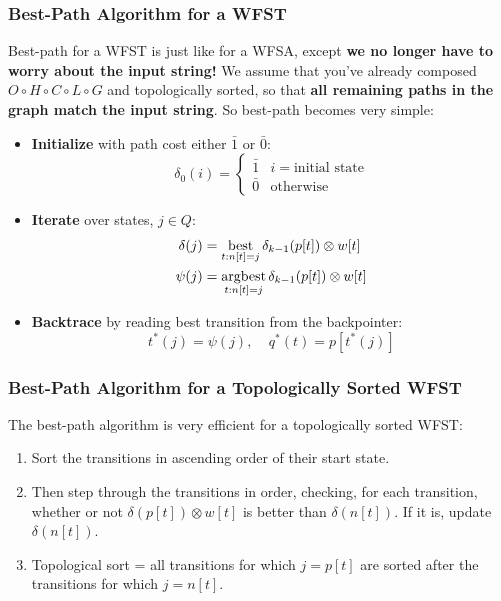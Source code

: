 \documentclass{beamer}
\newcommand{\best}{\operatornamewithlimits{best}}
\newcommand{\argbest}{\operatornamewithlimits{argbest}}
\begin{document}
\begin{frame}
  \frametitle{Best-Path Algorithm for a WFST}

  Best-path for a WFST is just like for a WFSA, except {\bf we no
    longer have to worry about the input string!}  We assume that
  you've already composed $O\circ H\circ C\circ L\circ G$ and
  topologically sorted, so that {\bf all remaining paths in the graph
    match the input string}.  So best-path becomes very simple:
  \begin{itemize}
  \item {\bf Initialize} with path cost either $\bar{1}$ or $\bar{0}$:
    \begin{displaymath}
      \delta_0(i) = \begin{cases}
        \bar{1} & i=\mbox{initial state}\\
        \bar{0} & \mbox{otherwise}
      \end{cases}
    \end{displaymath}
  \item {\bf Iterate} over states, $j\in Q$:
    \begin{align*}
      \delta(j) &= \best_{t:n[t]=j} \delta_{k-1}(p[t]) \otimes w[t]\\
      \psi(j) &= \argbest_{t:n[t]=j} \delta_{k-1}(p[t]) \otimes w[t]
    \end{align*}
  \item {\bf Backtrace} by reading best transition from the backpointer:
    \begin{displaymath}
      t^*(j) = \psi(j),~~~~~q^*(t)=p[t^*(j)]
    \end{displaymath}
  \end{itemize}
\end{frame}

\begin{frame}
  \frametitle{Best-Path Algorithm for a Topologically Sorted WFST}

  The best-path algorithm is very efficient for a topologically sorted
  WFST:
  \begin{enumerate}
  \item Sort the transitions in ascending order of their start state.
  \item Then step through the transitions in order, checking, for each
    transition, whether or not $\delta(p[t]) \otimes w[t]$ is better than
    $\delta(n[t])$.  If  it is, update     $\delta(n[t])$. 
  \item Topological sort = all transitions for which $j=p[t]$ are
    sorted after the transitions for which $j=n[t]$.
  \end{enumerate}
\end{frame}
\end{document}
